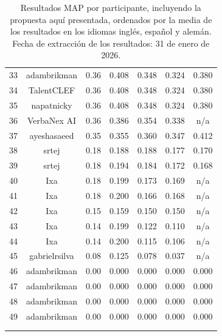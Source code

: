 \begin{xltabular}{\textwidth}{X cccccc}
    33 & adambrikman        & 0.36              & 0.408      & 0.348      & 0.324      & 0.380      \\
    34 & TalentCLEF         & 0.36              & 0.408      & 0.348      & 0.324      & 0.380      \\
    35 & napatnicky         & 0.36              & 0.408      & 0.348      & 0.324      & 0.380      \\
    36 & VerbaNex AI        & 0.36              & 0.386      & 0.354      & 0.338      & n/a        \\
    37 & ayeshasaeed        & 0.35              & 0.355      & 0.360      & 0.347      & 0.412      \\
    38 & srtej              & 0.18              & 0.188      & 0.188      & 0.177      & 0.170      \\
    39 & srtej              & 0.18              & 0.194      & 0.184      & 0.172      & 0.168      \\
    40 & Ixa                & 0.18              & 0.199      & 0.173      & 0.169      & n/a        \\
    41 & Ixa                & 0.18              & 0.200      & 0.166      & 0.168      & n/a        \\
    42 & Ixa                & 0.15              & 0.159      & 0.150      & 0.150      & n/a        \\
    43 & Ixa                & 0.14              & 0.199      & 0.122      & 0.110      & n/a        \\
    44 & Ixa                & 0.14              & 0.200      & 0.115      & 0.106      & n/a        \\
    45 & gabrielrsilva      & 0.08              & 0.125      & 0.078      & 0.037      & n/a        \\
    46 & adambrikman        & 0.00              & 0.000      & 0.000      & 0.000      & 0.000      \\
    47 & adambrikman        & 0.00              & 0.000      & 0.000      & 0.000      & 0.000      \\
    48 & adambrikman        & 0.00              & 0.000      & 0.000      & 0.000      & 0.000      \\
    49 & adambrikman        & 0.00              & 0.000      & 0.000      & 0.000      & 0.000      \\
    \hline
    \label{tab:final_results_test_mean}\\
    \caption{Resultados \gls{MAP} por participante, incluyendo la propuesta aquí presentada, ordenados por la media de los resultados en los idiomas inglés, español y alemán. Fecha de extracción de los resultados: 31 de enero de 2026.}
\end{xltabular}



